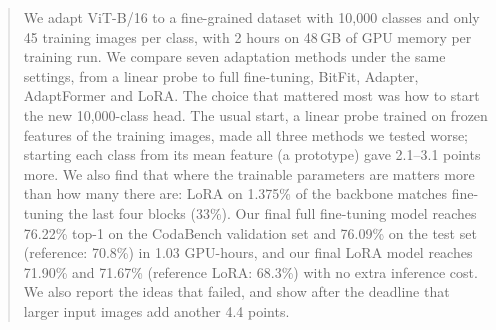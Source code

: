 \begin{abstract}
We adapt ViT-B/16 to a fine-grained dataset with 10,000 classes and only 45 training images per class, with 2 hours on 48\,GB of GPU memory per training run.
We compare seven adaptation methods under the same settings, from a linear probe to full fine-tuning, BitFit, Adapter, AdaptFormer and LoRA.
The choice that mattered most was how to start the new 10,000-class head.
The usual start, a linear probe trained on frozen features of the training images, made all three methods we tested worse; starting each class from its mean feature (a prototype) gave 2.1--3.1 points more.
We also find that where the trainable parameters are matters more than how many there are: LoRA on 1.375\% of the backbone matches fine-tuning the last four blocks (33\%).
Our final full fine-tuning model reaches 76.22\% top-1 on the CodaBench validation set and 76.09\% on the test set (reference: 70.8\%) in 1.03 GPU-hours, and our final LoRA model reaches 71.90\% and 71.67\% (reference LoRA: 68.3\%) with no extra inference cost.
We also report the ideas that failed, and show after the deadline that larger input images add another 4.4 points.
\end{abstract}
